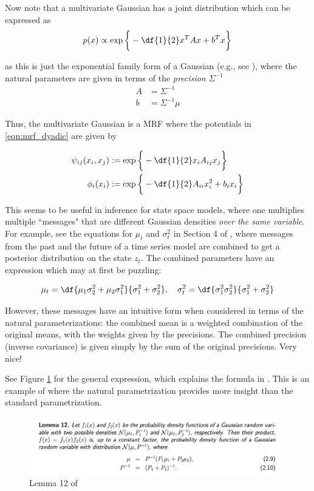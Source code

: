 \documentclass{article} %
\newcommand{\selfpotential}{\phi}
\newcommand{\edgepotential}{\psi}
\begin{document}
Now note that a multivariate Gaussian has a joint distribution which can be expressed as
\[ p(x) \propto \exp \bigg\{ -\df{1}{2} x^T A x + b^T x \bigg\} \]

as this is just the exponential family form of a Gaussian (e.g., see  \cite{englehardt_gaussian_models}), where the natural parameters are
given in terms of the \textit{precision} $\Sigma^{-1}$
\begin{align*}
A &= \Sigma^{-1} \\
b &= \Sigma^{-1} \mu
\end{align*}

Thus, the multivariate Gaussian is a MRF where the potentials in \eqref{eqn:mrf_dyadic} are given by

\begin{align*}
\edgepotential_{ij}(x_i, x_j) & := \exp \bigg\{ -\df{1}{2} x_i A_{ij} x_j \bigg\}  \\
\selfpotential_{i}(x_i) & := \exp \bigg\{ -\df{1}{2} A_{ii} x_i^2 + b_i x_i \bigg\}  
\end{align*}

This seems to be useful in inference for state space models, where one multiplies multiple ``messages" that are different Gaussian densities \textit{over the same variable}.   For example, see  the equations for $\mu_t$ and $\sigma^2_t$ in Section 4 of \cite{krishnan2016structured}, where messages from the past and the future of a time series model are combined to get a posterior distribution on the state $z_t$.   The combined parameters have an expression which may at first be puzzling:

\[ \mu_t = \df{\mu_1 \sigma^2_2 + \mu_2 \sigma^2_1}{\sigma^2_1 + \sigma^2_2}  , \quad \sigma^2_t = \df{\sigma^2_1 \sigma^2_2}{ \sigma^2_1 + \sigma^2_2} \]

However, these messages have an intuitive form when considered in terms of the natural parameterizations:  the combined mean is a weighted combination of the original means, with the weights given by the precisions.   The combined precision (inverse covariance) is given simply by the sum of the original precisions.  Very nice! 

 See Figure \ref{fig:lemma_twelve_bickson} for the general expression, which explains the formula in  \cite{krishnan2016structured}.  This is an example of where the natural parametrization provides more insight than the standard parametrization. 

\begin{figure}[H]
\includegraphics[width=\textwidth]{images/bickson_lemma_12}
\caption{Lemma 12 of \cite{bickson2008gaussian}}
\label{fig:lemma_twelve_bickson}
\end{figure}
\end{document}
